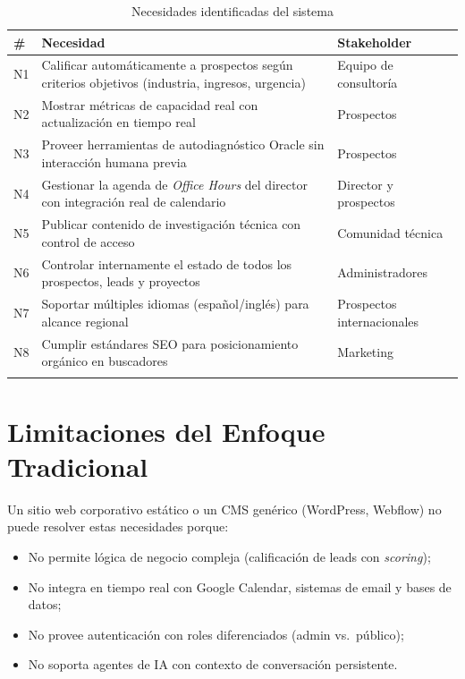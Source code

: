 \documentclass[12pt, a4paper, twoside]{report}
\begin{document}
\begin{center}
\begin{longtable}{C{0.8cm} L{8.5cm} L{4cm}}
  \toprule
  \textbf{\#} & \textbf{Necesidad} & \textbf{Stakeholder} \\
  \midrule
  \endhead
  N1 & Calificar automáticamente a prospectos según criterios objetivos
       (industria, ingresos, urgencia) & Equipo de consultoría \\[4pt]
  N2 & Mostrar métricas de capacidad real con actualización en tiempo real
       & Prospectos \\[4pt]
  N3 & Proveer herramientas de autodiagnóstico Oracle sin interacción humana
       previa & Prospectos \\[4pt]
  N4 & Gestionar la agenda de \textit{Office Hours} del director con integración
       real de calendario & Director y prospectos \\[4pt]
  N5 & Publicar contenido de investigación técnica con control de acceso
       & Comunidad técnica \\[4pt]
  N6 & Controlar internamente el estado de todos los prospectos, leads y proyectos
       & Administradores \\[4pt]
  N7 & Soportar múltiples idiomas (español/inglés) para alcance regional
       & Prospectos internacionales \\[4pt]
  N8 & Cumplir estándares SEO para posicionamiento orgánico en buscadores
       & Marketing \\
  \bottomrule
  \caption{Necesidades identificadas del sistema}
\end{longtable}
\end{center}

\section{Limitaciones del Enfoque Tradicional}

Un sitio web corporativo estático o un CMS genérico (WordPress, Webflow) no puede resolver
estas necesidades porque:

\begin{itemize}
  \item No permite lógica de negocio compleja (calificación de leads con \textit{scoring});
  \item No integra en tiempo real con Google Calendar, sistemas de email y bases de datos;
  \item No provee autenticación con roles diferenciados (admin vs.\ público);
  \item No soporta agentes de IA con contexto de conversación persistente.
\end{itemize}
\end{document}

